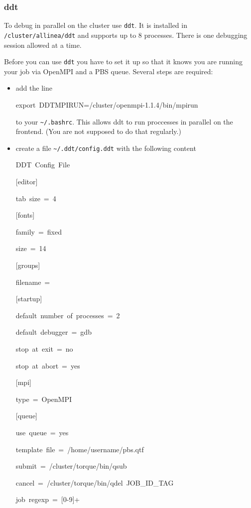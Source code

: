 \subsubsection{ddt}

To debug in parallel on the cluster use \texttt{ddt}. It is installed
in \texttt{/cluster/allinea/ddt} and supports up to 8 processes. There
is one debugging session allowed at a time.

Before you can use \texttt{ddt} you have to set it up so that it knows
you are running your job via OpenMPI and a PBS queue. Several steps
are required:

\begin{itemize}
\item add the line

\begin{lyxcode}
export~DDTMPIRUN=/cluster/openmpi-1.1.4/bin/mpirun
\end{lyxcode}
to your \texttt{\textasciitilde{}/.bashrc}. This allows ddt to run
proccesses in parallel on the frontend. (You are not supposed to do
that regularly.)

\item create a file \texttt{\textasciitilde{}/.ddt/config.ddt} with the
following content

\begin{lyxcode}
DDT~Config~File

{[}editor]~

tab~size~=~4

{[}fonts]~

family~=~fixed~

size~=~14

{[}groups]~

filename~=

{[}startup]~

default~number~of~processes~=~2~

default~debugger~=~gdb~

stop~at~exit~=~no~

stop~at~abort~=~yes

{[}mpi]~

type~=~OpenMPI

{[}queue]~

use~queue~=~yes~

template~file~=~/home/username/pbs.qtf~

submit~=~/cluster/torque/bin/qsub~

cancel~=~/cluster/torque/bin/qdel~JOB\_ID\_TAG~

job~regexp~=~{[}0-9]+~


\end{lyxcode}
\end{itemize}
